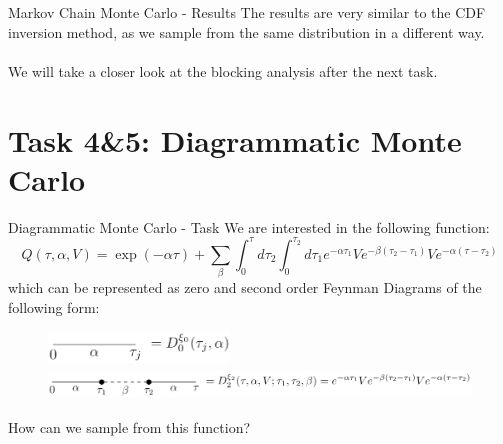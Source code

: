 \documentclass[10pt,xcolor=table, aspectratio=1610]{beamer}
\begin{document}
\begin{frame}[containsverbatim]{Markov Chain Monte Carlo - Results}
The results are very similar to the CDF inversion method, as we sample from the same distribution
in a different way. \\
\\
We will take a closer look at the blocking analysis after the next task.
\end{frame}

\section{Task 4\&5: Diagrammatic Monte Carlo}

\begin{frame}[containsverbatim]{Diagrammatic Monte Carlo - Task}
We are interested in the following function:
\begin{equation*}
  Q(\tau, \alpha, V)=\exp (-\alpha \tau)+\sum_\beta \int_0^\tau d \tau_2 \int_0^{\tau_2} d \tau_1 e^{-\alpha \tau_1} V e^{-\beta\left(\tau_2-\tau_1\right)} V e^{-\alpha\left(\tau-\tau_2\right)}
\end{equation*}
which can be represented as zero and second order \alert{Feynman Diagrams} of the following form:
\begin{figure}
  \centering
  \includegraphics[height=24pt]{images/feynman1.png}

  \includegraphics[height=24pt]{images/feynman2.png}
\end{figure}
How can we sample from this function?
\end{frame}
\end{document}
